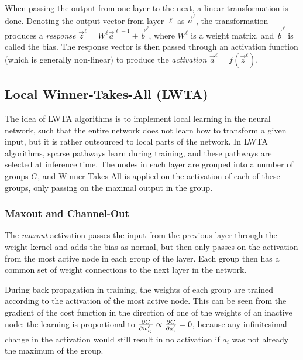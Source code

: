     When passing the output from one layer to the next, a linear transformation is done. Denoting the output vector from layer $\ell$ as $\vec{a}^\ell$, the transformation produces a \textit{response} $\vec{z}^{\ell} = W^\ell \vec{a}^{\ell-1} + \vec{b}^\ell$, where $W^\ell$ is a weight matrix, and $\vec{b}^\ell$ is called the bias. The response vector is then passed through an activation function (which is generally non-linear) to produce the \textit{activation} $\vec{a}^\ell = f(\vec{z}^\ell)$.

\subsection{Local Winner-Takes-All (LWTA)}
    The idea of LWTA algorithms is to implement local learning in the neural network, such that the entire network does not learn how to transform a given input, but it is rather outsourced to local parts of the network. In LWTA algorithms, sparse pathways learn during training, and these pathways are selected at inference time. The nodes in each layer are grouped into a number of groups $G$, and Winner Takes All is applied on the activation of each of these groups, only passing on the maximal output in the group.

    \subsubsection{Maxout and Channel-Out}
        The \textit{maxout} activation passes the input from the previous layer through the weight kernel and adds the bias as normal, but then only passes on the activation from the most active node in each group of the layer. Each group then has a common set of weight connections to the next layer in  the network.

        During back propagation in training, the weights of each group are trained according to the activation of the most active node. This can be seen from the gradient of the cost function in the direction of one of the weights of an inactive node: the learning is proportional to $\pd[w^{\ell}_{ij}]{C} \propto \pd[a^\ell_i]{C} = 0$, because any infinitesimal change in the activation would still result in no activation if $a_i$ was not already the maximum of the group.

